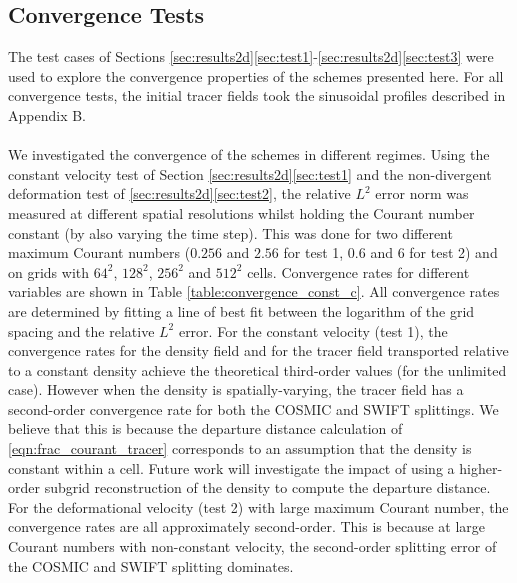 \documentclass{ametsocV6.1}
\begin{document}
\subsection{Convergence Tests} \label{sec:convergence}
The test cases of Sections \ref{sec:results2d}\ref{sec:test1}-\ref{sec:results2d}\ref{sec:test3} were used to explore the convergence properties of the schemes presented here.
For all convergence tests, the initial tracer fields took the sinusoidal profiles described in Appendix B. \\
\\
We investigated the convergence of the schemes in different regimes.
Using the constant velocity test of Section \ref{sec:results2d}\ref{sec:test1} and the non-divergent deformation test of \ref{sec:results2d}\ref{sec:test2}, the relative $L^2$ error norm was measured at different spatial resolutions whilst holding the Courant number constant (by also varying the time step).
This was done for two different maximum Courant numbers ($0.256$ and $2.56$ for test 1, $0.6$ and $6$ for test 2) and on grids with $64^2$, $128^2$, $256^2$ and $512^2$ cells.
Convergence rates for different variables are shown in Table \ref{table:convergence_const_c}.
All convergence rates are determined by fitting a line of best fit between the logarithm of the grid spacing and the relative $L^2$ error.
For the constant velocity (test 1), the convergence rates for the density field and for the tracer field transported relative to a constant density achieve the theoretical third-order values (for the unlimited case).
However when the density is spatially-varying, the tracer field has a second-order convergence rate for both the COSMIC and SWIFT splittings.
We believe that this is because the departure distance calculation of \eqref{eqn:frac_courant_tracer} corresponds to an assumption that the density is constant within a cell.
Future work will investigate the impact of using a higher-order subgrid reconstruction of the density to compute the departure distance.
For the deformational velocity (test 2) with large maximum Courant number, the convergence rates are all approximately second-order. This is because at large Courant numbers with non-constant velocity, the second-order splitting error of the COSMIC and SWIFT splitting dominates. 
\\
\end{document}
